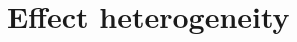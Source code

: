 \documentclass[reviewmode]{restat}
\begin{document}



\section{Effect heterogeneity}
\end{document}
